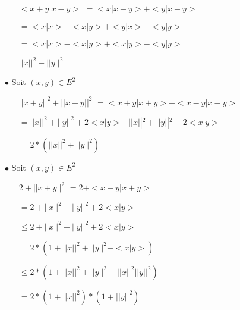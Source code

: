 \documentclass{article}
\begin{document}
\begin{center}
    \begin{minipage}{0.75\textwidth}    
        \begin{itemize}
            \item[$<x + y | x - y>$] $= <x | x - y> + <y | x - y>$
            \item[] $=<x | x> - <x | y> + <y | x> - <y | y>$
            \item[] $=<x | x> - <x | y> + <x | y> - <y | y>$
            \item[] $||x||^2 - ||y||^2$
        \end{itemize}
    \end{minipage}
\end{center}
$\bullet$ Soit $(x, y) \in E^2$
\begin{center}
    \begin{minipage}{0.75\textwidth}    
        \begin{itemize}
            \item[$||x + y||^2 + ||x - y||^2$] $= <x + y | x + y> +<x - y | x - y>$
            \item[] $= ||x||^2 + ||y||^2 + 2 <x|y> + ||x||^2 + ||y||^2 - 2 <x|y>$
            \item[] $= 2 * (||x||^2 + ||y||^2)$ 
        \end{itemize}
    \end{minipage}
\end{center}
$\bullet$ Soit $(x, y) \in E^2$
\begin{center}
    \begin{minipage}{0.75\textwidth}    
        \begin{itemize}
            \item[$2 + ||x + y||^2$] $= 2 + <x + y | x + y>$
            \item[] $=2 + ||x||^2 + ||y||^2 + 2 <x|y>$
            \item[] $\leq 2 + ||x||^2 + ||y||^2 + 2<x|y>$
            \item[] $= 2 * (1 + ||x||^2 + ||y||^2 + <x|y>)$
            \item[] $\leq 2 * (1 + ||x||^2 + ||y||^2 + ||x||^2||y||^2)$
            \item[] $=2 * (1 + ||x||^2) * (1 + ||y||^2)$  
        \end{itemize}
    \end{minipage}
\end{center}
\end{document}
